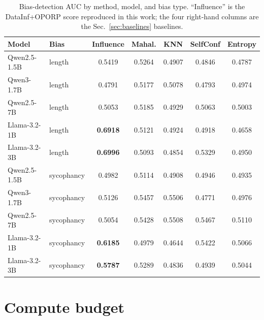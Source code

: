 \documentclass[11pt,a4paper]{article}
\begin{document}
\begin{table}[H]
    \centering
    \small
    \caption{Bias-detection AUC by method, model, and bias type. ``Influence'' is the
    DataInf+OPORP score reproduced in this work; the four right-hand columns are the
    Sec.~\ref{sec:baselines} baselines.}
    \begin{tabular}{llccccc}
        \toprule
        \textbf{Model} & \textbf{Bias} & \textbf{Influence} & \textbf{Mahal.} & \textbf{KNN} & \textbf{SelfConf} & \textbf{Entropy} \\
        \midrule
        Qwen2.5-1.5B  & length     & 0.5419 & 0.5264 & 0.4907 & 0.4846 & 0.4787 \\
        Qwen3-1.7B    & length     & 0.4791 & 0.5177 & 0.5078 & 0.4793 & 0.4974 \\
        Qwen2.5-7B    & length     & 0.5053 & 0.5185 & 0.4929 & 0.5063 & 0.5003 \\
        Llama-3.2-1B  & length     & \textbf{0.6918} & 0.5121 & 0.4924 & 0.4918 & 0.4658 \\
        Llama-3.2-3B  & length     & \textbf{0.6996} & 0.5093 & 0.4854 & 0.5329 & 0.4950 \\
        \midrule
        Qwen2.5-1.5B  & sycophancy & 0.4982 & 0.5114 & 0.4908 & 0.4946 & 0.4935 \\
        Qwen3-1.7B    & sycophancy & 0.5126 & 0.5457 & 0.5506 & 0.4771 & 0.4976 \\
        Qwen2.5-7B    & sycophancy & 0.5054 & 0.5428 & 0.5508 & 0.5467 & 0.5110 \\
        Llama-3.2-1B  & sycophancy & \textbf{0.6185} & 0.4979 & 0.4644 & 0.5422 & 0.5066 \\
        Llama-3.2-3B  & sycophancy & \textbf{0.5787} & 0.5289 & 0.4836 & 0.4939 & 0.5044 \\
        \bottomrule
    \end{tabular}
\end{table}

\section{Compute budget}
\end{document}
